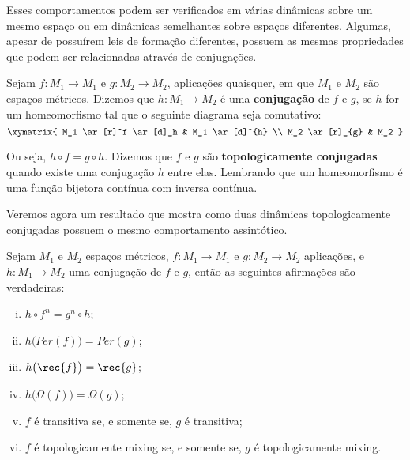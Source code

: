 Esses comportamentos podem ser verificados em várias dinâmicas sobre um mesmo espaço ou em dinâmicas semelhantes sobre espaços diferentes. Algumas, apesar de possuírem leis de formação diferentes, possuem as mesmas propriedades que podem ser relacionadas através de conjugações.

\begin{definicao} Sejam $f:M_1\to M_1$ e $g:M_2\to M_2$, aplicações quaisquer, em que $M_1$ e $M_2$ são espaços métricos. Dizemos que $h:M_1\to M_2$ é uma \textbf{conjugação} de $f$ e $g$, se $h$ for um homeomorfismo tal que o seguinte diagrama seja comutativo: 
\vspace{-0.1cm}$$\xymatrix{
        M_1 \ar[r]^f \ar[d]_h & M_1 \ar[d]^{h} \\
        M_2 \ar[r]_{g}       & M_2 }$$

Ou seja, $h\circ f= g\circ h$. Dizemos que $f$ e $g$ são \textbf{topologicamente conjugadas} quando existe uma conjugação $h$ entre elas. Lembrando que um homeomorfismo é uma função bijetora contínua com inversa contínua.
\end{definicao}

Veremos agora um resultado que mostra como duas dinâmicas topologicamente conjugadas possuem o mesmo comportamento assintótico.

\begin{teorema}\label{conjugacao} Sejam $M_1$ e $M_2$ espaços métricos, $f:M_1\to M_1$ e $g:M_2\to M_2$ aplicações, e $h:M_1\to M_2$ uma conjugação de $f$ e $g$, então as seguintes afirmações são verdadeiras:
\begin{enumerate}[i)]
\item $h\circ f^n= g^n\circ h$;
\item $h\big(Per(f)\big)=Per(g)$;
\item $h\big(\rec{f}\big)=\rec{g}$;
\item $h\big(\Omega(f)\big)=\Omega(g)$;
\item $f$ é transitiva se, e somente se, $g$ é transitiva;
\item $f$ é topologicamente mixing se, e somente se, $g$ é topologicamente mixing.
\end{enumerate}
\end{teorema}

